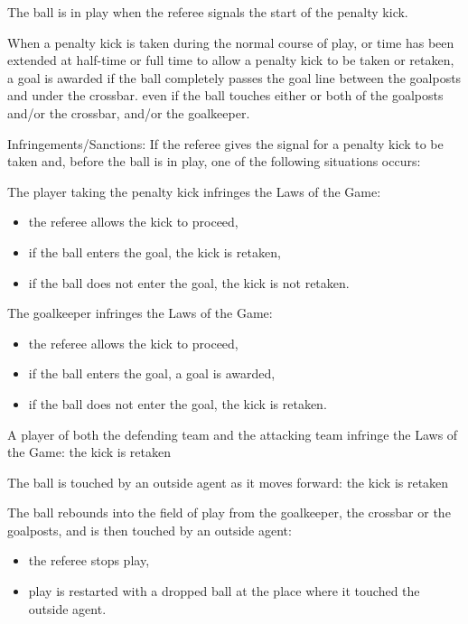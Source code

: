 \documentclass[12pt]{hurocup}
\begin{document}
\begin{lawlist}[US]
\item The ball is in play when the referee signals the start of the
  penalty kick.
  
\item When a penalty kick is taken during the normal course of play,
  or time has been extended at half-time or full time to allow a
  penalty kick to be taken or retaken, a goal is awarded if the ball
  completely passes the goal line between the goalposts and under the
  crossbar.  even if the ball touches either or both of the goalposts
  and/or the crossbar, and/or the goalkeeper.

\item Infringements/Sanctions: \label{pk-infringements} If the referee
  gives the signal for a penalty kick to be taken and, before the ball
  is in play, one of the following situations occurs:

  The player taking the penalty kick infringes the Laws of the Game:
  \begin{itemize}
  \item the referee allows the kick to proceed,
  \item if the ball enters the goal, the kick is retaken,
  \item if the ball does not enter the goal, the kick is not retaken.
  \end{itemize}

  The goalkeeper infringes the Laws of the Game:
  \begin{itemize}
  \item the referee allows the kick to proceed,
  \item if the ball enters the goal, a goal is awarded,
  \item if the ball does not enter the goal, the kick is retaken.
  \end{itemize}

  A player of both the defending team and the attacking team
  infringe the Laws of the Game: the kick is retaken

  The ball is touched by an outside agent as it moves forward: the
  kick is retaken

  The ball rebounds into the field of play from the goalkeeper,
  the crossbar or the goalposts, and is then touched by an outside agent:
  \begin{itemize}
  \item the referee stops play,
  \item play is restarted with a dropped ball at the place where it
    touched the outside agent. 
  \end{itemize}
\end{lawlist}
\end{document}

